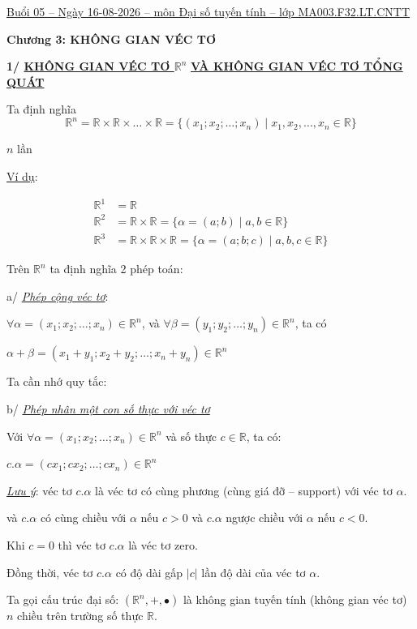 \documentclass[12pt,a4paper]{article}
\begin{document}
\ul{Buổi 05 -- Ngày 16-08-2026 -- môn Đại số tuyến tính -- lớp
MA003.F32.LT.CNTT}

\textbf{Chương 3: KHÔNG GIAN VÉC TƠ}

\textbf{1/ \ul{KHÔNG GIAN VÉC TƠ
}}$\mathbb{R}^n$ \textbf{\ul{VÀ
KHÔNG GIAN VÉC TƠ TỔNG QUÁT}}

Ta định nghĩa \[ \mathbb{R}^n = \mathbb{R} \times \mathbb{R} \times \dots \times \mathbb{R} = \{(x_1; x_2; \dots; x_n) \mid x_1, x_2, \dots, x_n \in \mathbb{R}\} \]

$n$ lần

\ul{Ví dụ}:

\begin{align*}
 \mathbb{R}^1 &= \mathbb{R} \\ \mathbb{R}^2 &= \mathbb{R} \times \mathbb{R} = \{\alpha = (a;b) \mid a,b \in \mathbb{R}\} \\ \mathbb{R}^3 &= \mathbb{R} \times \mathbb{R} \times \mathbb{R} = \{\alpha = (a;b;c) \mid a,b,c \in \mathbb{R}\} 
\end{align*}

Trên $\mathbb{R}^n$ ta định
nghĩa 2 phép toán:

a/ \emph{\ul{Phép cộng véc tơ}}:

$\forall \alpha = (x_1; x_2; \dots; x_n) \in \mathbb{R}^n$, và
$\forall \beta = (y_1; y_2; \dots; y_n) \in \mathbb{R}^n$, ta có

$\alpha + \beta = (x_1 + y_1; x_2 + y_2; \dots; x_n + y_n) \in \mathbb{R}^n$

Ta cần nhớ quy tắc:

b/ \emph{\ul{Phép nhân một con số thực với véc tơ}}

Với $\forall \alpha = (x_1; x_2; \dots; x_n) \in \mathbb{R}^n$ và số thực
$c \in \mathbb{R}$, ta có:

$c.\alpha = (cx_1; cx_2; \dots; cx_n) \in \mathbb{R}^n$

\emph{\ul{Lưu ý}}: véc tơ
$c.\alpha$ là véc tơ có
cùng phương (cùng giá đỡ -- support) với véc tơ
$\alpha$.

và $c.\alpha$ có cùng
chiều với $\alpha$ nếu
$c > 0$ và
$c.\alpha$ ngược chiều với
$\alpha$ nếu
$c < 0$.

Khi $c = 0$ thì véc tơ
$c.\alpha$ là véc tơ zero.

Đồng thời, véc tơ
$c.\alpha$ có độ dài gấp
$|c|$ lần độ dài của
véc tơ $\alpha$.

Ta gọi cấu trúc đại số:
$(\mathbb{R}^n, +, \bullet)$ là không gian
tuyến tính (không gian véc tơ)
$n$ chiều trên
trường số thực $\mathbb{R}$.
\end{document}
